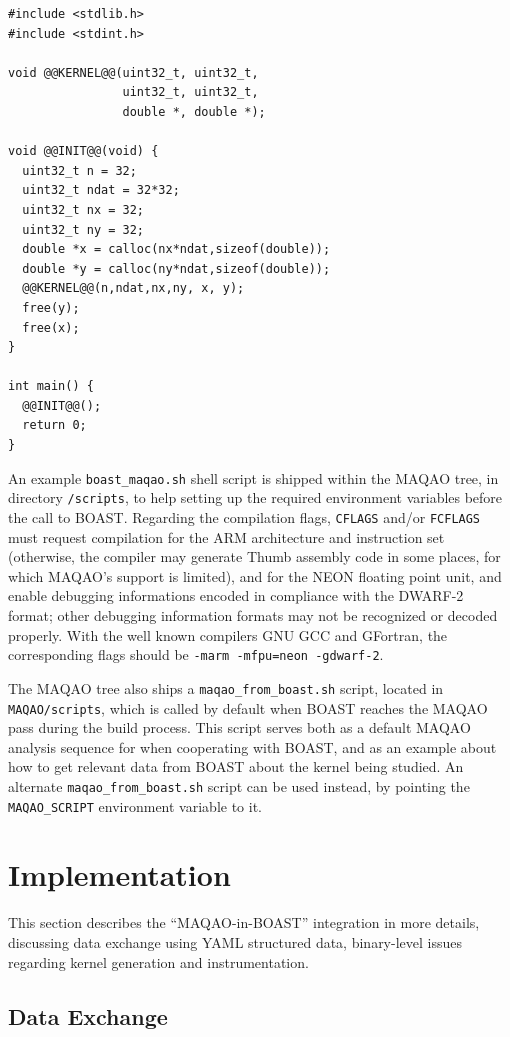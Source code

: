 \documentclass[11pt, a4paper, twoside]{montblanc2}
\begin{document}
\lstset{style=C}
\begin{lstlisting}
#include <stdlib.h>
#include <stdint.h>

void @@KERNEL@@(uint32_t, uint32_t,
                uint32_t, uint32_t,
                double *, double *);

void @@INIT@@(void) {
  uint32_t n = 32;
  uint32_t ndat = 32*32;
  uint32_t nx = 32;
  uint32_t ny = 32;
  double *x = calloc(nx*ndat,sizeof(double));
  double *y = calloc(ny*ndat,sizeof(double));
  @@KERNEL@@(n,ndat,nx,ny, x, y);
  free(y);
  free(x);
}

int main() {
  @@INIT@@();
  return 0;
}
\end{lstlisting}

An example \verb|boast_maqao.sh| shell script is shipped within the MAQAO tree, in directory 
\verb|/scripts|, to help setting up the required environment variables before the call to BOAST. Regarding 
the compilation flags, \texttt{CFLAGS} and/or \texttt{FCFLAGS} must request compilation for the ARM 
architecture and instruction set (otherwise, the compiler may generate Thumb assembly code in some 
places, for which MAQAO's support is limited), and for the NEON floating point unit, and enable 
debugging informations encoded in compliance with the DWARF-2 format; other debugging information 
formats may not be recognized or decoded properly. With the well known compilers GNU GCC and GFortran, 
the corresponding flags should be \verb|-marm -mfpu=neon -gdwarf-2|.

The MAQAO tree also ships a \verb|maqao_from_boast.sh| script, located in 
\verb|MAQAO/scripts|, which is called by default when BOAST reaches the MAQAO pass during the build 
process. This script serves both as a default MAQAO analysis sequence for when cooperating with 
BOAST, and as an example about how to get relevant data from BOAST about the kernel being studied. 
An alternate \verb|maqao_from_boast.sh| script can be used instead, by pointing the 
\verb|MAQAO_SCRIPT| environment variable to it.

\section{Implementation}\label{sec:implementation}

This section describes the ``MAQAO-in-BOAST'' integration in more details, discussing data exchange 
using YAML structured data, binary-level issues regarding kernel generation and instrumentation.

\subsection{Data Exchange}
\end{document}
